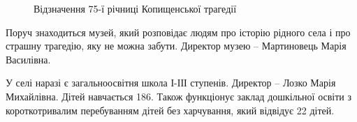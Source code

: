 \begin{figure}
\begin{subfigure}[b]{0.3\textwidth}
		\caption{}
		\label{fig:mouse}
		\end{subfigure}
	\caption{\label{fig:frog4}Відзначення 75-ї річниці Копищенської трагедії}\label{fig:animals}
\end{figure}

Поруч знаходиться музей, який розповідає людям про історію рідного села і про страшну трагедію, яку не можна забути. Директор музею – Мартиновець Марія Василівна.

У селі наразі є загальноосвітня школа І-ІІІ ступенів. Директор – Лозко Марія Михайлівна. Дітей навчається 186. Також функціонує заклад дошкільної освіти з короткотривалим перебуванням дітей без харчування, який відвідує 22 дітей.





